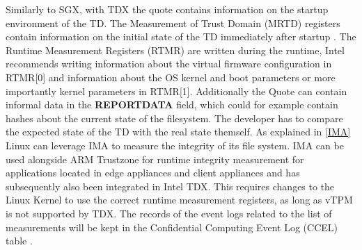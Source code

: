 \label{Identity}
Similarly to SGX, with TDX the quote contains information on the startup environment of the TD. The Measurement of Trust Domain (MRTD) registers contain information on the initial state of the TD immediately after startup \cite{intel_corporation_dcap_2024-1}. The Runtime Measurement Registers (RTMR) are written during the runtime, Intel recommends writing information about the virtual firmware configuration in RTMR[0] and information about the OS kernel and boot parameters or more importantly kernel parameters in RTMR[1]. Additionally the Quote can contain informal data in the \textbf{REPORTDATA} field, which could for example contain hashes about the current state of the filesystem. The developer has to compare the expected state of the TD with the real state themself. As explained in \ref{IMA} Linux can leverage IMA to measure the integrity of its file system. IMA can be used alongside ARM Trustzone for runtime integrity measurement for applications located in edge appliances and client appliances \cite{song_tz-ima_arm_2022} and has subsequently also been integrated in Intel TDX. This requires changes to the Linux Kernel to use the correct runtime measurement registers, as long as vTPM is not supported by TDX. The records of the event logs related to the list of measurements will be kept in the Confidential Computing Event Log (CCEL) table \cite{haidong_xia_runtime_integrity_measurement_2024}. 

